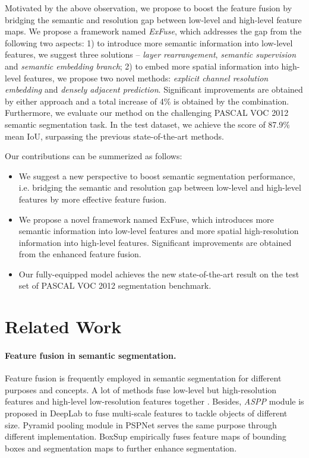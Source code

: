 \documentclass[runningheads]{llncs}
\begin{document}
Motivated by the above observation, we propose to boost the feature fusion by bridging the semantic and resolution gap between low-level and high-level feature maps. We propose a framework named \emph{ExFuse}, which addresses the gap from the following two aspects: 1) to introduce more semantic information into low-level features, we suggest three solutions -- \emph{layer rearrangement}, \emph{semantic supervision} and \emph{semantic embedding branch}; 2) to embed more spatial information into high-level features, we propose two novel methods: \emph{explicit channel resolution embedding} and \emph{densely adjacent prediction}. Significant improvements are obtained by either approach and a total increase of 4\% is obtained by the combination. Furthermore, we evaluate our method on the challenging PASCAL VOC 2012 \cite{Everingham2010The} semantic segmentation task. In the test dataset, we achieve the score of 87.9\% mean IoU, surpassing the previous state-of-the-art methods.

Our contributions can be summerized as follows:
\begin{itemize}
\item We suggest a new perspective to boost semantic segmentation performance, i.e. bridging the semantic and resolution gap between low-level and high-level features by more effective feature fusion.
\item We propose a novel framework named ExFuse, which introduces more semantic information into low-level features and more spatial high-resolution information into high-level features. Significant improvements are obtained from the enhanced feature fusion.
\item Our fully-equipped model achieves the new state-of-the-art result on the test set of PASCAL VOC 2012 segmentation benchmark. 
\end{itemize}

\section{Related Work}


\paragraph{Feature fusion in semantic segmentation.}
Feature fusion is frequently employed in semantic segmentation for different purposes and concepts. A lot of methods fuse low-level but high-resolution features and high-level low-resolution features together \cite{Ghiasi2016Laplacian,Islam_2017_CVPR,Ronneberger2015U,Peng2017Large,Long2015Fully,Lin2016RefineNet}. Besides, \emph{ASPP} module is proposed in DeepLab \cite{Chen2016DeepLab,Chen2017Rethinking,Chen2014Semantic} to fuse multi-scale features to tackle objects of different size. Pyramid pooling module in PSPNet \cite{Zhao2016Pyramid} serves the same purpose through different implementation. BoxSup \cite{Dai2015BoxSup} empirically fuses feature maps of bounding boxes and segmentation maps to further enhance segmentation.
\end{document}
